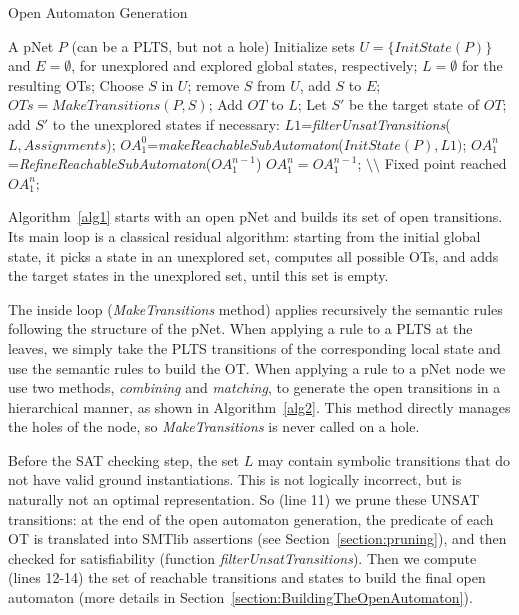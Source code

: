 \documentclass[smallcondensed]{svjour3}
\begin{document}
\begin{algorithm}[h]
  \caption{Open Automaton Generation}
  \label{alg1}
\begin{algorithmic}[1]
\Require A pNet $P$ (can be a PLTS, but not a hole)
\State Initialize sets $U=\{\mathit{InitState}(P)\}$ and $E=\emptyset$,
for unexplored and explored global states, respectively; $L=\emptyset$ for the resulting OTs;
	\State Choose $S$ in $U$; remove $S$ from $U$, add $S$ to $E$;
	\State $\mathit{OTs} = \mathit{MakeTransitions}(P, S)$;
          \State Add $\mathit{OT}$ to $L$;
          \State Let $S'$ be the target state of $\mathit{OT}$;
          add $S'$ to the unexplored states if necessary:
	  \EndFor
\EndWhile
\State $\mathit{L1}$=\textit{filterUnsatTransitions}($\mathit{L,Assignments}$);
\State $\mathit{OA_1^0}$=\textit{makeReachableSubAutomaton}($\mathit{InitState}(P),L1)$;
\Repeat $\mathit{OA_1^n}$=\textit{RefineReachableSubAutomaton}($\mathit{OA_1^{n-1}}$)
\Until  $\mathit{OA_1^n}=\mathit{OA_1^{n-1}}$;   \hfill $\setminus \setminus$ Fixed point reached
\State \Return $\mathit{OA_1^n}$;

\end{algorithmic}  
\end{algorithm}

Algorithm~\ref{alg1} starts with an open pNet and builds its set of open
transitions. Its main loop is a classical residual algorithm: starting
from the initial global state, it picks a state in an unexplored set, 
computes all possible OTs, and adds the target states in the
unexplored set, until this set is empty.

The inside loop (\emph{MakeTransitions} method) applies recursively
the semantic rules following the structure of the pNet.
When applying a rule to a PLTS at the leaves, we simply take the PLTS transitions of the
corresponding local state and use the semantic rules to build the OT.
When applying a rule to a pNet node we use two methods, \emph{combining} and
\emph{matching}, to generate the open transitions in a hierarchical manner,
as shown in Algorithm~\ref{alg2}. This method directly manages the
holes of the node, so \emph{MakeTransitions} is never called on a hole.

Before the SAT checking step, the set $L$ may contain symbolic transitions that
do not have valid ground instantiations. This is not logically
incorrect, but is naturally not an optimal representation. So (line 11) we prune
these UNSAT transitions: at the end of the open automaton generation,
the predicate of each OT is translated 
into SMTlib assertions (see Section~\ref{section:pruning}), and then checked for
satisfiability (function \textit{filterUnsatTransitions}). 
Then we compute (lines 12-14) the set of reachable transitions and states to build
the final open automaton (more details in Section~\ref{section:BuildingTheOpenAutomaton}).
\end{document}
